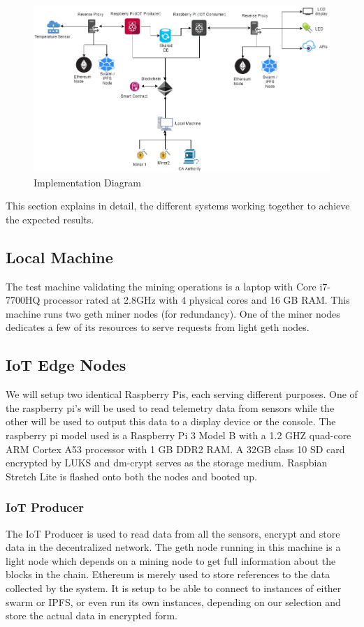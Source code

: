\documentclass[11pt,openright]{report}
\begin{document}
\begin{figure}
	\centering
	\includegraphics[scale=0.5]{images/Final_Implementationv2.png}
	\caption{Implementation Diagram}
	\label{fig:impldiagram_architechture}
\end{figure}


This section explains in detail, the different systems working together to achieve the expected results.

\subsection{Local Machine}
The test machine validating the mining operations is a laptop with Core i7-7700HQ processor rated at 2.8GHz with 4 physical cores and 16 GB RAM. This machine runs two geth miner nodes (for redundancy). One of the miner nodes dedicates a few of its resources to serve requests from light geth nodes.

\subsection{IoT Edge Nodes}
We will setup two identical Raspberry Pis, each serving different purposes. One of the raspberry pi's will be used to read telemetry data from sensors while the other will be used to output this data to a display device or the console.
The raspberry pi model used is a Raspberry Pi 3 Model B with a 1.2 GHZ quad-core ARM Cortex A53 processor with 1 GB DDR2 RAM. A 32GB class 10 SD card encrypted by LUKS and dm-crypt serves as the storage medium. Raspbian Stretch Lite is flashed onto both the nodes and booted up.

\subsubsection{IoT Producer}
The IoT Producer is used to read data from all the sensors, encrypt and store data in the decentralized network. The geth node running in this machine is a light node which depends on a mining node to get full information about the blocks in the chain. Ethereum is merely used to store references to the data collected by the system. It is setup to be able to connect to instances of either swarm or IPFS, or even run its own instances, depending on our selection and store the actual data in encrypted form.
\end{document}
